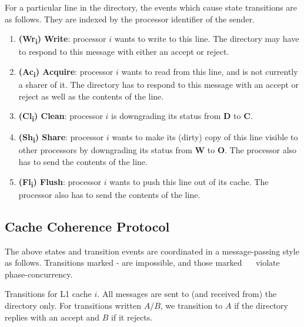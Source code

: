 \documentclass{article}
\begin{document}
For a particular line in the directory, the events which cause state transitions are as follows. They are indexed by the processor identifier of the sender.

\begin{enumerate}
\item \textbf{(Wr\textsubscript{i}) Write}: processor $i$ wants to write to this line. The directory may have to respond to this message with either an accept or reject.
\item \textbf{(Ac\textsubscript{i}) Acquire}: processor $i$ wants to read from this line, and is not currently a sharer of it. The directory has to respond to this message with an accept or reject as well as the contents of the line.
\item \textbf{(Cl\textsubscript{i}) Clean}: processor $i$ is downgrading its status from \textbf{D} to \textbf{C}.
\item \textbf{(Sh\textsubscript{i}) Share}: processor $i$ wants to make its (dirty) copy of this line visible to other processors by downgrading its status from \textbf{W} to \textbf{O}. The processor also has to send the contents of the line.
\item \textbf{(Fl\textsubscript{i}) Flush}: processor $i$ wants to push this line out of its cache. The processor also has to send the contents of the line.
\end{enumerate}

\subsection{Cache Coherence Protocol}
The above states and transition events are coordinated in a message-passing style as follows. Transitions marked - are impossible, and those marked ~\frownie~ violate phase-concurrency.

Transitions for L1 cache $i$. All messages are sent to (and received from) the directory only. For transitions written $A/B$, we transition to $A$ if the directory replies with an accept and $B$ if it rejects.
\end{document}

